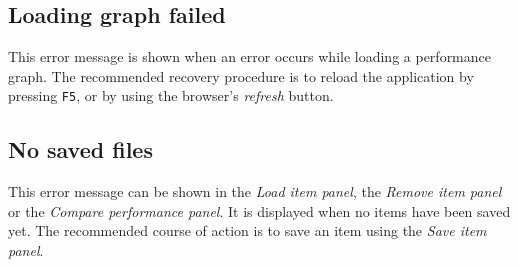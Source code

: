 \subsection{Loading graph failed}
This error message is shown when an error occurs while loading a performance graph. The recommended recovery procedure is to reload the application by pressing \texttt{F5}, or by using the browser's \emph{refresh} button.

\subsection{No saved files}
This error message can be shown in the \emph{Load item panel}, the \emph{Remove item panel} or the \emph{Compare performance panel}. It is displayed when no items have been saved yet. The recommended course of action is to save an item using the \emph{Save item panel}.